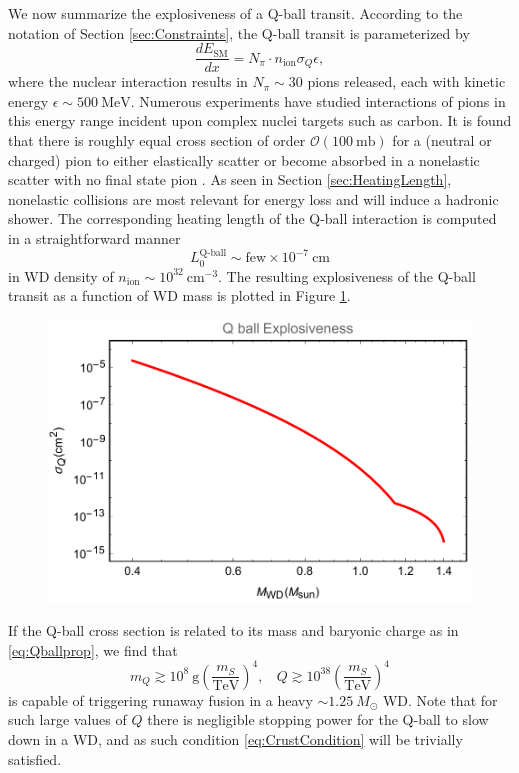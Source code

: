 \documentclass[twocolumn,showpacs,preprintnumbers,amsmath,amssymb,prd]{revtex4}
\newcommand{\OO}{\mathcal{O}}
\def\r{\right)}
\def\l{\left(}
\begin{document}
We now summarize the explosiveness of a Q-ball transit. According to the notation of Section \ref{sec:Constraints}, the Q-ball transit is parameterized by
\begin{equation}
\frac{d E_\text{SM}}{d x} = N_\pi \cdot n_\text{ion} \sigma_Q \epsilon,
\end{equation}
where the nuclear interaction results in $N_\pi \sim 30$ pions released, each with kinetic energy $\epsilon \sim 500 ~\text{MeV}$. Numerous experiments have studied interactions of pions in this energy range incident upon complex nuclei targets such as carbon. It is found that there is roughly equal cross section of order $\OO (100 ~\text{mb})$ for a (neutral or charged) pion to either elastically scatter or become absorbed in a nonelastic scatter with no final state pion \cite{Pionnuclear}. As seen in Section \ref{sec:HeatingLength}, nonelastic collisions are most relevant for energy loss and will induce a hadronic shower. The corresponding heating length of the Q-ball interaction is computed in a straightforward manner
\begin{equation}
L_0^\text{Q-ball} \sim \text{few} \times 10^{-7} ~\text{cm}
\end{equation}
in WD density of $n_\text{ion} \sim 10^{32} ~\text{cm}^{-3}$. The resulting explosiveness of the Q-ball transit as a function of WD mass is plotted in Figure \ref{fig:boomQball}.
\begin{figure}
\label{fig:boomQball}
\includegraphics[scale=.45]{boomQball.pdf}
\end{figure}
If the Q-ball cross section is related to its mass and baryonic charge as in \eqref{eq:Qballprop}, we find that
\begin{equation}
\label{eq:Qballbound}
m_Q \gtrsim 10^8 ~\text{g} \l\frac{m_S}{\text{TeV}}\r^4, ~~~~ Q \gtrsim 10^{38} \l\frac{m_S}{\text{TeV}}\r^4
\end{equation}
is capable of triggering runaway fusion in a heavy $\sim 1.25 ~M_{\odot}$ WD. Note that for such large values of $Q$ there is negligible stopping power for the Q-ball to slow down in a WD, and as such condition \eqref{eq:CrustCondition} will be trivially satisfied.
\end{document}
